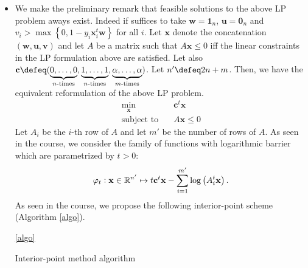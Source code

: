\documentclass{article}
\begin{document}
\begin{itemize}
       \item We make the preliminary remark that
           feasible solutions to the above LP
           problem aways exist. Indeed
           if suffices to take $\mathbf{w} = \mathbf{1}_{n}$,
           $\mathbf{u} = \mathbf{0}_{n}$ and
           $v_{i} > \max\left\{0, 1 - y_{i}\mathbf{x}_{i}^{t}\mathbf{w}\right\}$ 
           for all $i$.
           Let $\mathbf{x}$ denote the concatenation
           $\left(\mathbf{w}, \mathbf{u}, \mathbf{v}\right)$ and 
           let $A$ be a matrix such that $A\mathbf{x} \leq 0$
           iff the linear constraints in the LP formulation
           above are satisfied. Let also
           $\mathbf{c} \defeq (
           \underbrace{0, \ldots, 0}_{\text{$n$-times}},
           \underbrace{1, \ldots, 1}_{\text{$n$-times}},
           \underbrace{\alpha, \ldots, \alpha}_{\text{$m$-times}})$.
           Let $n' \defeq 2n + m$. Then,
           we have the equivalent reformulation
           of the above LP problem.
           \begin{align*}
               \min_{\mathbf{x}} \quad & \mathbf{c}^{t}\mathbf{x} \\
               \text{subject to} \quad & A \mathbf{x} \leq 0 
           \end{align*}
           Let $A_{i}$ be the $i$-th row of
           $A$ and let $m'$ be the number of
           rows of $A$.
           As seen in the course, we consider
           the family of functions with
           logarithmic barrier which 
           are parametrized by $t > 0$:
           \begin{equation*}
               \varphi_{t} \vcentcolon \mathbf{x} \in \mathbb{R}^{n'}
               \mapsto t \mathbf{c}^{t}\mathbf{x}
               - \sum_{i = 1}^{m'} \log \left(A_{i}^{t}\mathbf{x}\right).
           \end{equation*}
           As seen in the course, we propose
           the following interior-point scheme (Algorithm \ref{algo}).
           \begin{algorithm}
               \ref{algo}
               \caption{Interior-point method algorithm}
               

           \end{algorithm}
           

\end{itemize}
\end{document}
